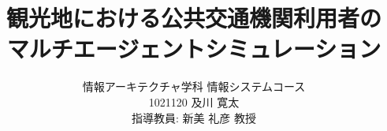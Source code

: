 \documentclass[12pt,a4paper,dvipdfmx,twocolumn]{jsarticle}
\begin{document}
\title{
  観光地における公共交通機関利用者の \\
  マルチエージェントシミュレーション
}

\author{
  情報アーキテクチャ学科 情報システムコース \\
  1021120 及川 寛太 \\
  指導教員: 新美 礼彦 教授
}

\date{}

\maketitle

\thispagestyle{fancy}







\end{document}
